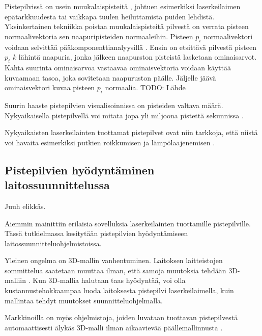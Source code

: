 Pistepilvissä on usein muukalaispisteitä , johtuen esimerkiksi laserkeilaimen epätarkkuudesta tai vaikkapa tuulen heiluttamista puiden lehdistä. Yksinkertainen tekniikka poistaa muukalaispisteitä pilvestä on verrata pisteen normaalivektoria sen naapuripisteiden normaaleihin. Pisteen $p_i$ normaalivektori voidaan selvittää pääkomponenttianalyysillä . Ensin on etsittävä pilvestä pisteen $p_i$ $k$ lähintä naapuria, jonka jälkeen naapurston pisteistä lasketaan ominaisarvot. Kahta suurinta ominaisarvoa vastaavaa ominaisvektoria voidaan käyttää kuvaamaan tasoa, joka sovitetaan naapuruston päälle. Jäljelle jäävä ominaisvektori kuvaa pisteen $p_i$ normaalia. TODO: Lähde



Suurin haaste pistepilvien visualisoinnissa on pisteiden valtava määrä. Nykyaikaisella pistepilvellä voi mitata jopa yli miljoona pistettä sekunnissa \cite{Elseberg}.

Nykyaikaisten laserkeilainten tuottamat pistepilvet ovat niin tarkkoja, että niistä voi havaita esimerkiksi putkien roikkumisen ja lämpölaajenemisen \cite{Piipponen}. 


\subsection{Pistepilvien hyödyntäminen laitossuunnittelussa}
Juuh elikkäs\cite{cadmatic}.

Aiemmin mainittiin erilaisia sovelluksia laserkeilainten tuottamille pistepilville. Tässä tutkielmassa kesitytään pistepilvien hyödyntämiseen laitossuunnitteluohjelmistoissa.

Yleinen ongelma on 3D-mallin vanhentuminen. Laitoksen laitteistojen sommittelua saatetaan muuttaa ilman, että samoja muutoksia tehdään 3D-malliin \cite{Piipponen}. Kun 3D-mallia halutaan taas hyödyntää, voi olla kustannustehokkaampaa luoda laitoksesta pistepilvi laserkeilaimella, kuin mallintaa tehdyt muutokset suunnitteluohjelmalla.


Markkinoilla on myös ohjelmistoja, joiden luvataan tuottavan pistepilvestä automaattisesti älykäs 3D-malli ilman aikaavievää päällemallinnusta \cite{aveva}.

